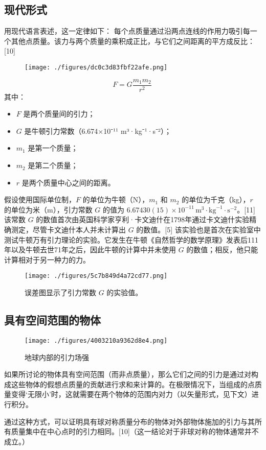 \subsection{现代形式}
用现代语言表述，这一定律如下：
每个点质量通过沿两点连线的作用力吸引每一个其他点质量。该力与两个质量的乘积成正比，与它们之间距离的平方成反比：[10] 
\begin{figure}[ht]
\centering
\texttt{[image: ./figures/dc0c3d83fbf22afe.png]}
\caption{} \label{fig_NEWW_1}
\end{figure}
\[
F = G \frac{m_1 m_2}{r^2}~
\]
其中：
\begin{itemize}
\item \( F \) 是两个质量间的引力；
\item \( G \) 是牛顿引力常数（6.674×10⁻¹¹ m³·kg⁻¹·s⁻²）；
\item \( m_1 \) 是第一个质量；
\item \( m_2 \) 是第二个质量；
\item \( r \) 是两个质量中心之间的距离。
\end{itemize}
假设使用国际单位制，\( F \) 的单位为牛顿（N），\( m_1 \) 和 \( m_2 \) 的单位为千克（kg），\( r \) 的单位为米（m），引力常数 \( G \) 的值为 \( 6.67430(15) \times 10^{-11} \, \text{m}^3 \cdot \text{kg}^{-1} \cdot \text{s}^{-2} \)。[11] 该常数 \( G \) 的数值首次由英国科学家亨利·卡文迪什在1798年通过卡文迪什实验精确测定，尽管卡文迪什本人并未计算出 \( G \) 的数值。[5] 该实验也是首次在实验室中测试牛顿万有引力理论的实验。它发生在牛顿《自然哲学的数学原理》发表后111年以及牛顿去世71年之后，因此牛顿的计算中并未使用 \( G \) 的数值；相反，他只能计算相对于另一种力的力。
\begin{figure}[ht]
\centering
\texttt{[image: ./figures/5c7b849d4a72cd77.png]}
\caption{误差图显示了引力常数 \( G \) 的实验值。} \label{fig_NEWW_2}
\end{figure}
\subsection{具有空间范围的物体}
\begin{figure}[ht]
\centering
\texttt{[image: ./figures/4003210a9362d8e4.png]}
\caption{地球内部的引力场强} \label{fig_NEWW_3}
\end{figure}
如果所讨论的物体具有空间范围（而非点质量），那么它们之间的引力是通过对构成这些物体的假想点质量的贡献进行求和来计算的。在极限情况下，当组成的点质量变得‘无限小’时，这就需要在两个物体的范围内对力（以矢量形式，见下文）进行积分。

通过这种方式，可以证明具有球对称质量分布的物体对外部物体施加的引力与其所有质量集中在中心点时的引力相同。[10]（这一结论对于非球对称的物体通常并不成立。）


